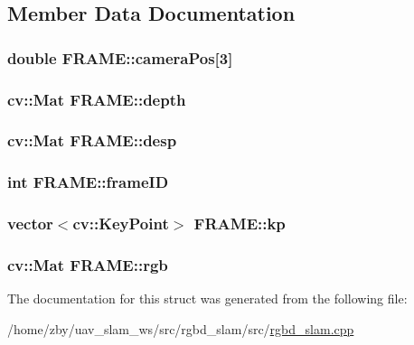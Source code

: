 \subsection{Member Data Documentation}
\hypertarget{struct_f_r_a_m_e_a6b71c4deb9405c3d03ec1477fa6dea43}{
\subsubsection[{camera\-Pos}]{\setlength{\rightskip}{0pt plus 5cm}double F\-R\-A\-M\-E\-::camera\-Pos\mbox{[}3\mbox{]}}}\label{struct_f_r_a_m_e_a6b71c4deb9405c3d03ec1477fa6dea43}
\hypertarget{struct_f_r_a_m_e_a2252df16c853a9b54e36d0bbdbe14a92}{
\subsubsection[{depth}]{\setlength{\rightskip}{0pt plus 5cm}cv\-::\-Mat F\-R\-A\-M\-E\-::depth}}\label{struct_f_r_a_m_e_a2252df16c853a9b54e36d0bbdbe14a92}
\hypertarget{struct_f_r_a_m_e_aa85154a4977026ba1944bc1fe14c05c6}{
\subsubsection[{desp}]{\setlength{\rightskip}{0pt plus 5cm}cv\-::\-Mat F\-R\-A\-M\-E\-::desp}}\label{struct_f_r_a_m_e_aa85154a4977026ba1944bc1fe14c05c6}
\hypertarget{struct_f_r_a_m_e_a6db11cfd8c965393d608aaf485574fd4}{
\subsubsection[{frame\-I\-D}]{\setlength{\rightskip}{0pt plus 5cm}int F\-R\-A\-M\-E\-::frame\-I\-D}}\label{struct_f_r_a_m_e_a6db11cfd8c965393d608aaf485574fd4}
\hypertarget{struct_f_r_a_m_e_ab825c7b736d6770f78563af562831aba}{
\subsubsection[{kp}]{\setlength{\rightskip}{0pt plus 5cm}vector$<$cv\-::\-Key\-Point$>$ F\-R\-A\-M\-E\-::kp}}\label{struct_f_r_a_m_e_ab825c7b736d6770f78563af562831aba}
\hypertarget{struct_f_r_a_m_e_a1a7cfb8b9de8861c69130e37981d7e7e}{
\subsubsection[{rgb}]{\setlength{\rightskip}{0pt plus 5cm}cv\-::\-Mat F\-R\-A\-M\-E\-::rgb}}\label{struct_f_r_a_m_e_a1a7cfb8b9de8861c69130e37981d7e7e}


The documentation for this struct was generated from the following file\-:\begin{DoxyCompactItemize}
\item 
/home/zby/uav\-\_\-slam\-\_\-ws/src/rgbd\-\_\-slam/src/\hyperlink{rgbd__slam_8cpp}{rgbd\-\_\-slam.\-cpp}\end{DoxyCompactItemize}
